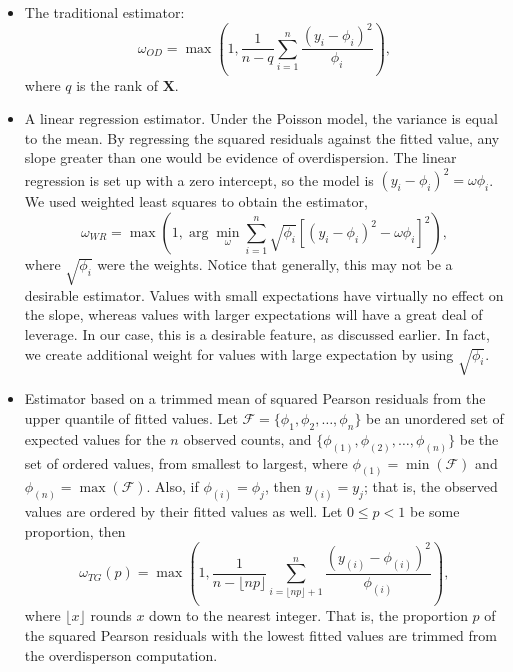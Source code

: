 \documentclass[12pt, titlepage]{article}\usepackage[]{graphicx}\usepackage[]{color}
\def\bX{\mathbf{X}}
\def\cF{\mathcal{F}}
\begin{document}
\begin{itemize}

\item The traditional estimator:
\[
\omega_{OD} = \max\left(1, \frac{1}{n-q}\sum_{i=1}^n\frac{(y_i-\phi_i)^2}{\phi_i}\right),
\]
where $q$ is the rank of $\bX$.
\item A linear regression estimator.  Under the Poisson model, the variance is equal to the mean.  By regressing the squared residuals against the fitted value, any slope greater than one would be evidence of overdispersion.  The linear regression is set up with a zero intercept, so the model is $(y_i - \phi_i)^2 = \omega\phi_i$.  We used weighted least squares to obtain the estimator,
\[
\omega_{WR} = \max\left(1, \arg\underset{\omega}{\min}\sum_{i=1}^n\sqrt{\phi_i}[(y_i - \phi_i)^2 - \omega\phi_i]^2\right),
\]
where $\sqrt{\phi_i}$ were the weights.  Notice that generally, this may not be a desirable estimator.  Values with small expectations have virtually no effect on the slope, whereas values with larger expectations will have a great deal of leverage.  In our case, this is a desirable feature, as discussed earlier.  In fact, we create additional weight for values with large expectation by using $\sqrt{\phi_i}$.
\item Estimator based on a trimmed mean of squared Pearson residuals from the upper quantile of fitted values.  Let $\cF = \{\phi_1, \phi_2, \ldots, \phi_n\}$ be an unordered set of expected values for the $n$ observed counts, and $\{\phi_{(1)}, \phi_{(2)}, \ldots, \phi_{(n)}\}$ be the set of ordered values, from smallest to largest, where $\phi_{(1)}=\min(\cF)$ and $\phi_{(n)}=\max(\cF)$. Also, if $\phi_{(i)} = \phi_j$, then $y_{(i)} = y_j$; that is, the observed values are ordered by their fitted values as well. Let $0 \le p < 1$ be some proportion, then
\[
\omega_{TG}(p) = \max\left(1, \frac{1}{n - \lfloor np \rfloor}
	\sum_{i = \lfloor np \rfloor + 1}^n\frac{(y_{(i)}-\phi_{(i)})^2}{\phi_{(i)}}\right),
\]
where $\lfloor x \rfloor$ rounds $x$ down to the nearest integer.  That is, the proportion $p$ of the squared Pearson residuals with the lowest fitted values are trimmed from the overdisperson computation.
\end{itemize}
\end{document}
